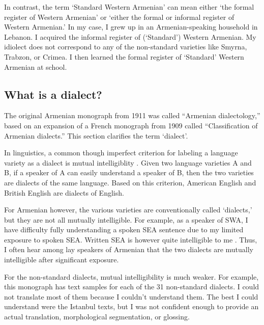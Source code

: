 In contrast, the term `Standard Western Armenian' can mean either `the formal register of Western Armenian' or `either the formal or informal register of Western Armenian.' In my case, I grew up in an Armenian-speaking household in Lebanon. I acquired the informal register of (`Standard') Western Armenian. My idiolect does not correspond to any of the non-standard varieties like Smyrna, Trabzon, or Crimea. I then learned the formal register of `Standard' Western Armenian at school. 









\subsection{What is a dialect?}\label{sec:HossepIntro:armenian:whatisdialect}

The original Armenian monograph from 1911 was called ``Armenian dialectology,'' based on an expansion of a French monograph from 1909 called ``Classification of Armenian dialects.'' This section clarifies the term `dialect'. 


In linguistics, a common though imperfect criterion for labeling a language variety as a dialect is mutual intelligiblity \citep[3]{ChambersTrudgill-1998-Dialectology}. Given two language varieties A and B, if a speaker of A can easily understand a speaker of B, then the two varieties are dialects of the same language. Based on this criterion, American English and British English are dialects of English. 

For Armenian however, the various varieties are conventionally called `dialects,' but they are not all mutually intelligible. For example, as a speaker of SWA, I have difficulty fully understanding a spoken SEA sentence due to my limited exposure to spoken SEA. Written SEA is however quite intelligible to me \citep[cf. intelligibility asymmetries discussed by ][197]{DumTragut-2012-AmenTeghHayGaPluricentricArmenian}. Thus, I often hear among lay speakers of Armenian that the two dialects are mutually intelligible after significant exposure. 

For the non-standard dialects, mutual intelligibility   is much weaker. For example, this monograph has text samples for each of the 31 non-standard dialects. I could not translate most of them because I couldn't understand them. The best I could understand were the Istanbul texts, but I was not confident enough to provide an actual translation, morphological segmentation, or glossing. 


